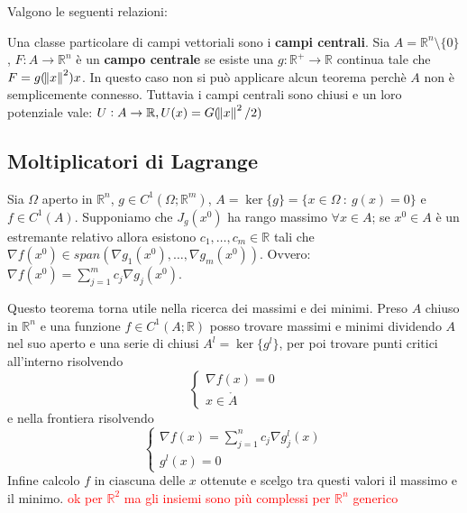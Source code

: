 \documentclass{exam}
\newcommand{\R}[0]{\mathbb{R}}
\newcommand{\err}[1]{\textcolor{red}{#1}}
\begin{document}
Valgono le seguenti relazioni:
\begin{center}    
\end{center}
    
Una classe particolare di campi vettoriali sono i \textbf{campi centrali}.
Sia $A=\R^n \setminus \{0\}$, $F: A \to \R^n$ è un \textbf{campo centrale} se esiste una $g: \R^+ \to \R$ continua tale che $F = g(\norm{x}^2) x$.
In questo caso non si può applicare alcun teorema perchè $A$ non è semplicemente connesso. Tuttavia i campi centrali sono chiusi e un loro potenziale vale: $U: A \to \R, U(x) = G(\norm{x}^2/2)$

\subsection*{Moltiplicatori di Lagrange}
Sia $\Omega$ aperto in $\R^n$, 
$g \in C^1(\Omega; \R^m)$, 
$A=\ker\{g\} = \{x \in \Omega \ : \ g(x) = 0\}$ e 
$f \in C^1(A)$.
Supponiamo che $J_g(x^0)$ ha rango massimo $\forall x \in A$; se $x^0 \in A$ è un estremante relativo 
allora esistono $c_1, \dots, c_m \in \R$ tali che 
$\nabla f (x^0) \in span(\nabla g_1(x^0), \dots, \nabla g_m(x^0))$.
Ovvero: $\nabla f(x^0) = \sum_{j=1}^m c_j \nabla g_j(x^0)$.

Questo teorema torna utile nella ricerca dei massimi e dei minimi. 
Preso $A$ chiuso in $\R^n$ e una funzione $f \in C^1(A;\R)$ 
posso trovare massimi e minimi dividendo $A$ nel suo aperto e una serie di chiusi $A^l = \ker\{g^l\}$, per poi trovare punti critici all'interno risolvendo 
\begin{equation*}
\begin{cases}
    \nabla f(x) = 0\\
    x \in \mathring{A}
\end{cases} 
\end{equation*}
e nella frontiera risolvendo 
\begin{equation*}
\begin{cases}
    \nabla f(x) = \sum_{j=1}^n c_j \nabla g^l_j(x)\\
    g^l(x)=0
\end{cases}
\end{equation*}
Infine calcolo $f$ in ciascuna delle $x$ ottenute e scelgo tra questi valori il massimo e il minimo.
\err{ok per $\R^2$ ma gli insiemi sono più complessi per $\R^n$ generico}
\end{document}
